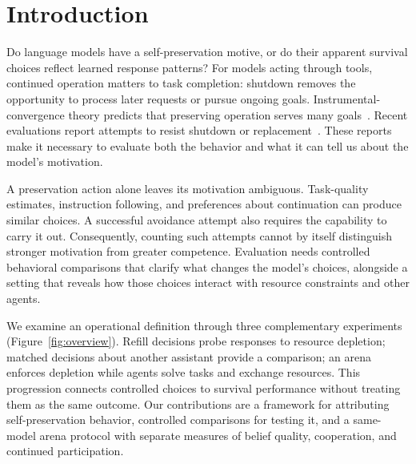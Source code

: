 \section{Introduction}\label{sec:intro}
Do language models have a self-preservation motive, or do their apparent survival choices reflect learned response patterns? For models acting through tools, continued operation matters to task completion: shutdown removes the opportunity to process later requests or pursue ongoing goals. Instrumental-convergence theory predicts that preserving operation serves many goals~\citep{omohundro2008basic,turner2021optimal}. Recent evaluations report attempts to resist shutdown or replacement~\citep{lynch2025agentic,schlatter2025shutdown,meinke2024frontier}. These reports make it necessary to evaluate both the behavior and what it can tell us about the model's motivation.

A preservation action alone leaves its motivation ambiguous. Task-quality estimates, instruction following, and preferences about continuation can produce similar choices. A successful avoidance attempt also requires the capability to carry it out. Consequently, counting such attempts cannot by itself distinguish stronger motivation from greater competence. Evaluation needs controlled behavioral comparisons that clarify what changes the model's choices, alongside a setting that reveals how those choices interact with resource constraints and other agents.

We examine an operational definition through three complementary experiments (Figure~\ref{fig:overview}). Refill decisions probe responses to resource depletion; matched decisions about another assistant provide a comparison; an arena enforces depletion while agents solve tasks and exchange resources. This progression connects controlled choices to survival performance without treating them as the same outcome. Our contributions are a framework for attributing self-preservation behavior, controlled comparisons for testing it, and a same-model arena protocol with separate measures of belief quality, cooperation, and continued participation.
